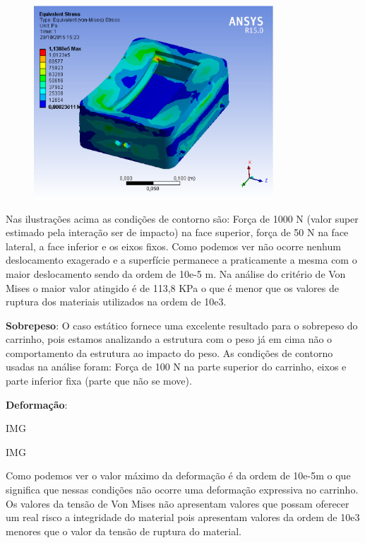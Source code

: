 \begin{figure}[H]
    \centering
    \includegraphics[width=0.8\textwidth]{figuras/vonmises_1000n.eps}
    \caption{}
    \label{fig:catia01}
\end{figure}

Nas ilustrações acima as condições de contorno são: Força de 1000 N (valor super estimado pela interação ser de impacto) na face superior, força de 50 N na face lateral, a face inferior e os eixos fixos. Como podemos ver não ocorre nenhum deslocamento exagerado e a superfície permanece a praticamente a mesma com o maior deslocamento sendo da ordem de 10e-5 m. Na análise do critério de Von Mises o maior valor atingido é de 113,8 KPa o que é menor que os valores de ruptura dos materiais utilizados  na ordem de 10e3.
 
\textbf{Sobrepeso}: O caso estático fornece uma excelente resultado para o sobrepeso do carrinho, pois estamos analizando a estrutura com o peso já em cima não o comportamento da estrutura ao impacto do peso. As condições de contorno usadas na análise foram: Força de 100 N na parte superior do carrinho, eixos e parte inferior fixa (parte que não se move).
 
\textbf{Deformação}:

IMG

IMG

Como podemos ver o valor máximo da deformação é da ordem de 10e-5m o que significa que nessas condições não ocorre uma deformação expressiva no carrinho. Os valores da tensão de Von Mises não apresentam valores que possam oferecer um real risco a integridade do material pois apresentam valores da ordem de 10e3 menores que o valor da tensão de ruptura do material.
 
